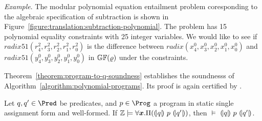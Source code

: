 \noindent
\emph{Example}.
The modular polynomial equation entailment problem coresponding to the
algebraic specification of subtraction is shown in
Figure~\ref{figure:translation:subtraction-polynomial}. The problem
has 15 polynomial equality constraints with 25 integer variables. We would like
to see if $\mathit{radix51}({r}^2_4, {r}^2_3, {r}^2_2,
{r}^2_1, {r}^2_0)$ is the difference between $\mathit{radix}({x}^0_4,
{x}^0_3, {x}^0_2, {x}^0_1, {x}^0_0)$ and $\mathit{radix51}({y}^0_4,
{y}^0_3, {y}^0_2, {y}^0_1, {y}^0_0)$ in $\mathbb{GF}(\varrho)$ under the
constraints. 

Theorem~\ref{theorem:program-to-q-soundness} establishes the
soundnesss of Algorithm~\ref{algorithm:polynomial-programs}. Its proof
is again certified by \coq.
\begin{theorem}
  \label{theorem:program-to-q-soundness}
  Let $q, q' \in \Pred$ be predicates, and $p \in \Prog$ a program in
  static single assignment form and well-formed. 
  If $\bbfZ \models \forall \vx.\Pi(\hoaretriple{q}{p}{q'})$, then
  $\models$ ${(\!|}{q}{|\!)}~{p}~{(\!|}{q'}{|\!)}$.
\end{theorem}

